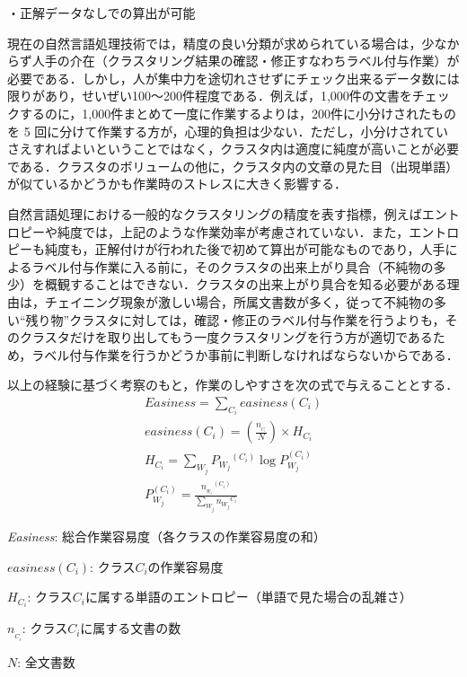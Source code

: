 \documentclass[japanese]{jnlp_1.4}
\begin{document}
・正解データなしでの算出が可能

現在の自然言語処理技術では，精度の良い分類が求められている場合は，少なからず人手の介在（クラスタリング結果の確認・修正すなわちラベル付与作業）が必要である．しかし，人が集中力を途切れさせずにチェック出来るデータ数には限りがあり，せいぜい100〜200件程度である．例えば，1,000件の文書をチェックするのに，1,000件まとめて一度に作業するよりは，200件に小分けされたものを 5 回に分けて作業する方が，心理的負担は少ない．ただし，小分けされていさえすればよいということではなく，クラスタ内は適度に純度が高いことが必要である．クラスタのボリュームの他に，クラスタ内の文章の見た目（出現単語）が似ているかどうかも作業時のストレスに大きく影響する．

自然言語処理における一般的なクラスタリングの精度を表す指標，例えばエントロピーや純度では，上記のような作業効率が考慮されていない．また，エントロピーも純度も，正解付けが行われた後で初めて算出が可能なものであり，人手によるラベル付与作業に入る前に，そのクラスタの出来上がり具合（不純物の多少）を概観することはできない．クラスタの出来上がり具合を知る必要がある理由は，チェイニング現象が激しい場合，所属文書数が多く，従って不純物の多い``残り物''クラスタに対しては，確認・修正のラベル付与作業を行うよりも，そのクラスタだけを取り出してもう一度クラスタリングを行う方が適切であるため，ラベル付与作業を行うかどうか事前に判断しなければならないからである．

 以上の経験に基づく考察のもと，作業のしやすさを次の式で与えることとする．
\begin{gather*}
 \mathit{Easiness} = \sum_{C_{i}} \mathit{easiness} (C_{i}) \\
 \mathit{easiness} (C_{i}) = \left( \frac{n_{{}_{C_{i}}}}{N}\right) \times H_{C_{i}} \\
 H_{C_{i}} = \sum_{W_{j}} P_{W_{j}} {}^{(C_{i})}\log P_{W_{j}}^{(C_{i})} \\
 P_{W_{j}}^{(C_{i})} = \frac{n_{{}_{W_{j}}}{}^{(C_{i})}}{\sum\limits_{W_{j}}n_{W_{j}}{}^{C_{i}}}
\end{gather*}

\noindent
\textit{Easiness}: 総合作業容易度（各クラスの作業容易度の和）

\noindent
$\mathit{easiness}(C_{i})$: クラス$C_{i}$の作業容易度

\noindent
$H_{C_{i}}$: クラス$C_{i}$に属する単語のエントロピー（単語で見た場合の乱雑さ）

\noindent
$n_{{}_{C_{i}}}$: クラス$C_{i}$に属する文書の数

\noindent
$N$: 全文書数
\end{document}
